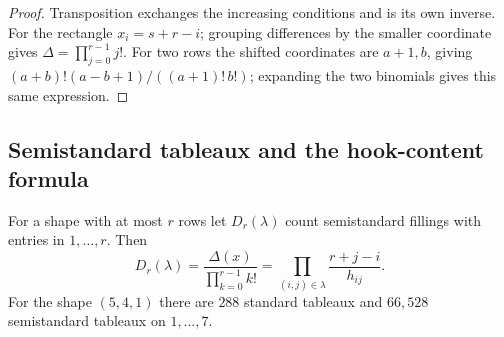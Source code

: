 \begin{proof}
Transposition exchanges the increasing conditions and is its own inverse.
For the rectangle \(x_i=s+r-i\); grouping differences by the smaller
coordinate gives \(\Delta=\prod_{j=0}^{r-1}j!\). For two rows
the shifted coordinates are \(a+1,b\), giving
\((a+b)!(a-b+1)/((a+1)!\,b!)\); expanding the two binomials gives this
same expression.
\end{proof}

\subsection{Semistandard tableaux and the hook-content formula}

\begin{theorem}\label{result16}
For a shape with at most \(r\) rows let \(D_r(\lambda)\) count
semistandard fillings with entries in \(1,\ldots,r\). Then
\[
 D_r(\lambda)=\frac{\Delta(x)}{\prod_{k=0}^{r-1}k!}
 =\prod_{(i,j)\in\lambda}\frac{r+j-i}{h_{ij}}.
\]
For the shape \((5,4,1)\) there are \(288\) standard tableaux and
\(66{,}528\) semistandard tableaux on \(1,\ldots,7\).
\end{theorem}
